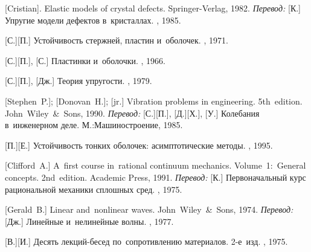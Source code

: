 \begin{thebibliography}{123}
\begin{otherlanguage}{russian}
[Cristian]. Elastic models of crystal defects. Springer\hbox{-}Verlag, 1982. 
\emph{Перевод:} [К.] Упругие модели дефектов в~кристаллах. \mirpublisher, 1985. 

[С.][П.] Устойчивость стержней, пластин и~оболочек. \naukapublisher, 1971. 

[С.][П.], [С.] Пластинки и~оболочки. \naukapublisher, 1966. 

[С.][П.], [Дж.] Теория упругости. \naukapublisher, 1979. 

[Stephen~P.];
[Donovan~H.];
[jr.]
Vibration problems in engineering.
5th~edition. John~Wiley~\&~Sons, 1990. 
\emph{Перевод:} [С.][П.], [Д.][Х.], [У.] Колебания в~инженерном деле. М.:\;Машино\-строение, 1985. 

[П.][Е.] Устойчивость тонких оболочек: асимптотические методы. \naukapublisher, 1995. 

[Clifford~A.] A~first course in~rational continuum mechanics. Volume~1:~General concepts. 2nd~edition. Academic Press, 1991.  %
\emph{Перевод:} [К.] Первоначальный курс рациональной механики сплошных сред. \mirpublisher, 1975. 

[Gerald~B.] Linear and~nonlinear waves. John~Wiley~\&~Sons, 1974. 
\emph{Перевод:} [Дж.] Линейные и~нелинейные волны. \mirpublisher, 1977. 

[В.][И.] Десять лекций\hbox{-}бесед по~сопротивлению материалов. 2\hbox{-}е~изд. \naukapublisher, 1975. 


\end{otherlanguage}
\end{thebibliography}
